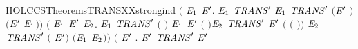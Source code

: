 \begin{SaveVerbatim}{HOLCCSTheoremsTRANSXXstrongind}
     \ensuremath{(}\HOLSymConst{\HOLTokenForall{}}  \ensuremath{\HOLBoundVar{E}\sb{\mathrm{1}}} \ensuremath{\HOLBoundVar{E}\sp{\prime{}}}.
         \HOLTokenTransBegin{}\HOLTokenTransEnd \ensuremath{\HOLBoundVar{E}\sb{\mathrm{1}}} \HOLSymConst{\HOLTokenConj{}} \ensuremath{\HOLBoundVar{TRANS}\sp{\prime{}}}   \ensuremath{\HOLBoundVar{E}\sb{\mathrm{1}}} \HOLSymConst{\HOLTokenImp{}} \ensuremath{\HOLBoundVar{TRANS}\sp{\prime{}}} \ensuremath{(}\ensuremath{\HOLBoundVar{E}\sp{\prime{}}} \HOLSymConst{\ensuremath{\mid}} \ensuremath{)}  \ensuremath{(}\ensuremath{\HOLBoundVar{E}\sp{\prime{}}} \HOLSymConst{\ensuremath{\mid}} \ensuremath{\HOLBoundVar{E}\sb{\mathrm{1}}}\ensuremath{)}\ensuremath{)} \HOLSymConst{\HOLTokenConj{}}
     \ensuremath{(}\HOLSymConst{\HOLTokenForall{}}  \ensuremath{\HOLBoundVar{E}\sb{\mathrm{1}}} \ensuremath{\HOLBoundVar{E}\sp{\prime{}}} \ensuremath{\HOLBoundVar{E}\sb{\mathrm{2}}}.
         \HOLTokenTransBegin{} \HOLTokenTransEnd \ensuremath{\HOLBoundVar{E}\sb{\mathrm{1}}} \HOLSymConst{\HOLTokenConj{}} \ensuremath{\HOLBoundVar{TRANS}\sp{\prime{}}}  \ensuremath{(} \ensuremath{)} \ensuremath{\HOLBoundVar{E}\sb{\mathrm{1}}} \HOLSymConst{\HOLTokenConj{}}
        \ensuremath{\HOLBoundVar{E}\sp{\prime{}}} \HOLTokenTransBegin{} \ensuremath{(} \ensuremath{)}\HOLTokenTransEnd \ensuremath{\HOLBoundVar{E}\sb{\mathrm{2}}} \HOLSymConst{\HOLTokenConj{}} \ensuremath{\HOLBoundVar{TRANS}\sp{\prime{}}} \ensuremath{\HOLBoundVar{E}\sp{\prime{}}} \ensuremath{(} \ensuremath{(} \ensuremath{)}\ensuremath{)} \ensuremath{\HOLBoundVar{E}\sb{\mathrm{2}}} \HOLSymConst{\HOLTokenImp{}}
        \ensuremath{\HOLBoundVar{TRANS}\sp{\prime{}}} \ensuremath{(} \HOLSymConst{\ensuremath{\mid}} \ensuremath{\HOLBoundVar{E}\sp{\prime{}}}\ensuremath{)} \HOLConst{\ensuremath{\tau}} \ensuremath{(}\ensuremath{\HOLBoundVar{E}\sb{\mathrm{1}}} \HOLSymConst{\ensuremath{\mid}} \ensuremath{\HOLBoundVar{E}\sb{\mathrm{2}}}\ensuremath{)}\ensuremath{)} \HOLSymConst{\HOLTokenConj{}}
     \ensuremath{(}\HOLSymConst{\HOLTokenForall{}}  \ensuremath{\HOLBoundVar{E}\sp{\prime{}}}  .
         \HOLTokenTransBegin{}\HOLTokenTransEnd \ensuremath{\HOLBoundVar{E}\sp{\prime{}}} \HOLSymConst{\HOLTokenConj{}} \ensuremath{\HOLBoundVar{TRANS}\sp{\prime{}}}   \ensuremath{\HOLBoundVar{E}\sp{\prime{}}} \HOLSymConst{\HOLTokenConj{}}

\end{SaveVerbatim}
